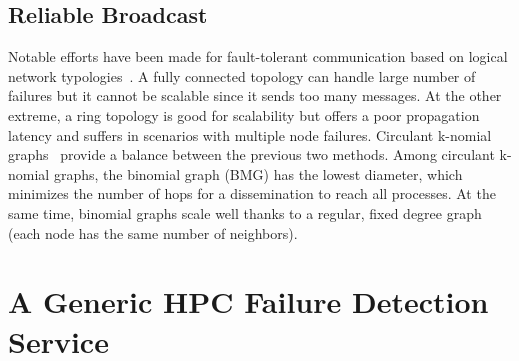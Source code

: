 \documentclass[sigconf]{acmart}
\begin{document}
\subsection{Reliable Broadcast}
Notable efforts have been made for fault-tolerant communication based on logical network typologies~\cite{Luo18}. A fully connected topology can handle large number of failures but it cannot be scalable since it sends too many messages. At the other extreme, a ring topology is good for scalability
but offers a poor propagation latency and suffers in scenarios with multiple node failures.
Circulant k-nomial graphs~\cite{Angskun07, Pava11} provide a balance between the previous two methods. 
Among circulant k-nomial graphs, the binomial graph (BMG) has the lowest diameter, which minimizes the number of hops for a dissemination to reach all 
processes. At the same time, binomial graphs scale well thanks to a regular, fixed degree graph (each node has the same number of neighbors). 
%

 
\section{A Generic HPC Failure Detection Service}\label{sec:design}
\end{document}
